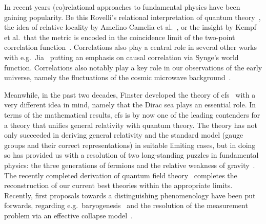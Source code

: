 \documentclass[reqno,11pt]{amsart}
\numberwithin{equation}{section}
\begin{document}
In recent years (co)relational approaches to fundamental physics have been gaining popularity.
Be this Rovelli's relational interpretation of quantum theory~\cite{rovelli1996relational,martin2023fact, smerlak2007relational,laudisa2019open,yang2019relational,robson2024relational}, the idea of relative locality by Amelino-Camelia et al.~\cite{amelino2011principle}, or the insight by Kempf et al.~that the metric is
encoded in the coincidence limit of the two-point correlation function~\cite{kempf2021correlational, reitz2023model}.
Correlations also play a central role in several other works~\cite{ormrod2024quantum,smolin2020temporal,oldofredi2021bundle,vidotto2022relational,kastner2022transactional, padmanabhan2020probing} with e.g.~Jia~\cite{jia2021correlationalworld,jia2022complexsimplicalQG,jiatimeorder} putting an emphasis on causal
correlation via Synge's world function.
Correlations also notably play a key role in our observations of the early universe, namely the fluctuations of the cosmic
microwave background~\cite{planck2016astronomy}.

Meanwhile, in the past two decades, Finster developed the theory of \ac{cfs}~\cite{cfs, website} with a very different
idea in mind, namely that the Dirac sea plays an essential role.
In terms of the mathematical results, \ac{cfs} is by now one of the leading contenders for a theory that unifies general relativity
with quantum theory.
The theory has not only succeeded in deriving general relativity and the standard model (gauge groups and their correct
representations) in suitable limiting cases, but in doing so has provided us with a resolution of two long-standing
puzzles in fundamental physics: the three generations of fermions and the relative weakness of gravity~\cite{cfs}.
The recently completed derivation of quantum field theory~\cite{qft} completes the reconstruction of our current best
theories within the appropriate limits.
Recently, first proposals towards a distinguishing phenomenology have been put forwards, regarding e.g.~baryogenesis~\cite{baryogenesis}
and the resolution of the measurement problem via an effective collapse model~\cite{finster2024causal}.
\end{document}
